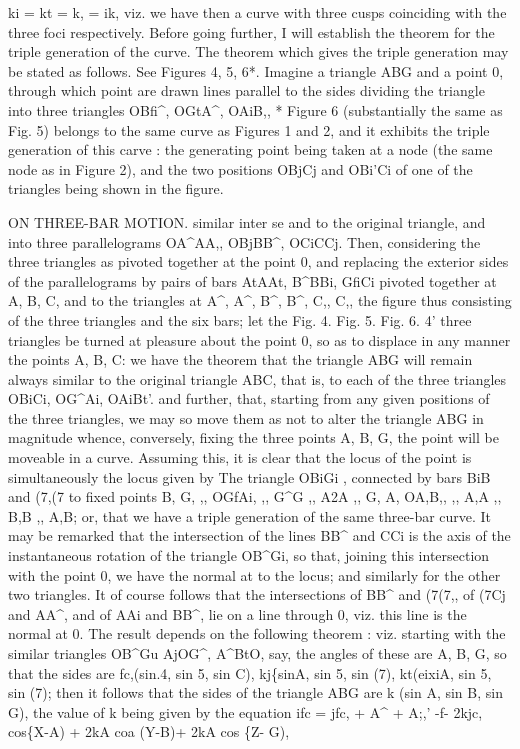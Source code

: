 \documentclass[11pt,a4paper]{book}
\begin{document}
ki = kt = k, = ik,
viz. we have
then a curve with
three cusps coinciding
with the three
foci respectively.
Before
going
further,
I
will
establish
the
theorem
for
the
triple
generation
of
the curve.
The
theorem
which
gives
the
triple
generation
may
be
stated
as
follows.
See
Figures
4,
5, 6*.
Imagine
a
triangle ABG and
a
point
0,
through
which
point
are
drawn
lines
parallel
to
the
sides
dividing
the
triangle
into
three
triangles
OBfi\textasciicircum{},
OGtA\textasciicircum{},
OAiB,,
*
Figure
6
(substantially
the
same
as
Fig.
5)
belongs
to
the
same
curve
as
Figures
1
and
2,
and
it
exhibits the
triple
generation
of
this
carve
:
the
generating
point
being
taken
at
a
node
(the same node
as in Figure
2), and the two positions OBjCj and OBi'Ci
of one of the triangles being shown
in the figure.

ON THREE-BAR MOTION.
similar
inter
se
and
to
the
original
triangle,
and
into
three
parallelograms
OA\textasciicircum{}AA,,
OBjBB\textasciicircum{},
OCiCCj.
Then,
considering
the
three
triangles
as
pivoted
together
at
the
point
0,
and
replacing
the
exterior
sides
of
the
parallelograms
by
pairs
of
bars
AtAAt, B\textasciicircum{}BBi, GfiCi pivoted
together at A, B,
C, and
to the
triangles at A\textasciicircum{}, A\textasciicircum{}, B\textasciicircum{}, B\textasciicircum{},
C,, C,,
the
figure
thus
consisting
of the
three
triangles
and
the
six
bars;
let
the
Fig.
4.
Fig.
5.
Fig.
6.
4'
three
triangles
be
turned
at
pleasure
about
the
point
0,
so
as
to
displace
in
any
manner
the
points A, B, C:
we
have
the
theorem that the triangle ABG will remain
always
similar
to
the
original
triangle ABC,
that
is,
to
each
of
the
three
triangles
OBiCi,
OG\textasciicircum{}Ai,
OAiBt'.
and
further,
that,
starting
from
any
given
positions
of
the
three
triangles, we may so move them as not to
alter the triangle ABG in magnitude
whence,
conversely,
fixing
the
three
points
A, B,
G,
the
point
will be moveable
in
a curve.
Assuming
this,
it
is
clear
that
the
locus
of
the
point
is
simultaneously
the
locus given by
The triangle
OBiGi
, connected
by bars BiB
and
(7,(7
to
fixed
points
B,
G,
,,
OGfAi,
,,
G\textasciicircum{}G
,,
A2A
,,
G,
A,
OA,B,,
,,
A,A
,,
B,B
,,
A,B;
or,
that
we
have
a
triple
generation
of
the
same
three-bar
curve.
It
may
be
remarked that the intersection
of the
lines BB\textasciicircum{} and CCi
is
the axis of the instantaneous
rotation
of the
triangle
OB\textasciicircum{}Gi,
so
that,
joining
this
intersection
with
the
point
0,
we
have
the
normal
at
to
the
locus;
and
similarly
for
the
other
two
triangles.
It
of course
follows
that
the
intersections
of BB\textasciicircum{}
and
(7(7,,
of
(7Cj and AA\textasciicircum{},
and
of
AAi and BB\textasciicircum{},
lie on a
line through
0,
viz.
this
line
is the normal at
0.
The
result
depends
on
the
following
theorem
:
viz.
starting
with
the
similar
triangles
OB\textasciicircum{}Gu
AjOG\textasciicircum{},
A\textasciicircum{}BtO,
say,
the
angles
of
these
are
A,
B,
G,
so
that
the
sides are
fc,(sin.4,
sin 5,
sin C), kj\{sinA, sin 5, sin (7), kt(eixiA, sin 5,
sin (7);
then
it
follows that the sides
of the
triangle ABG are
k (sin A, sin B,
sin G),
the
value
of k being given by
the equation
ifc\guillemotleft{} = jfc,\guillemotleft{} + A\textasciicircum{}\guillemotright{} + A;,' -f- 2kjc, cos\{X-A) + 2kA coa (Y-B)+ 2kA cos \{Z- G),
\end{document}
